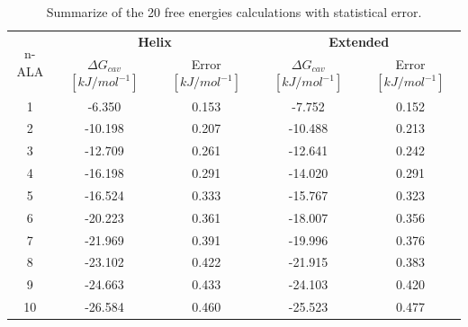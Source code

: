 \begin{table}[th] %
    \centering
    \begin{tabular}{c|cc|cc}
    \toprule
    \multirow{2}{4em}{n-ALA}           &   \multicolumn{2}{c|}{\textbf{Helix}} & \multicolumn{2}{c}{\textbf{Extended}}\\

    &    $\Delta G_{cav}$ $[kJ/mol^{-1}]$ & Error $[kJ/mol^{-1}]$     &  $\Delta G_{cav}$ $[kJ/mol^{-1}]$    &    Error $[kJ/mol^{-1}]$  \\
    \midrule
    1         &   -6.350  &   0.153                  &   -7.752                 &   0.152\\
    2         &   -10.198  &   0.207                 &   -10.488                &   0.213\\
    3         &   -12.709  &   0.261                 &   -12.641                &   0.242\\
    4         &   -16.198  &   0.291                 &   -14.020                &   0.291\\
    5         &   -16.524  &   0.333                 &   -15.767                &   0.323\\
    6         &   -20.223  &   0.361                 &   -18.007                &   0.356\\
    7         &  -21.969  &   0.391                  &   -19.996                &   0.376\\
    8         &   -23.102  &   0.422                 &   -21.915                &   0.383\\
    9         &  -24.663  &   0.433                  &   -24.103                &   0.420\\
    10        &   -26.584  &   0.460                 &   -25.523                &   0.477\\
    \bottomrule
    \end{tabular}
    \caption{Summarize of the 20 free energies calculations with statistical error.}
    \label{table:DG_final}
\end{table}

